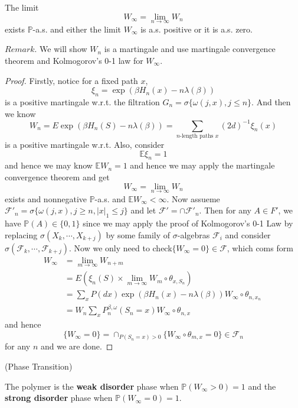 \begin{theorem}
    The limit
    \[W_{\infty} = \lim\limits_{n\to\infty} W_n\]
    exists $\mathbb{P}$-a.s. and either the limit $W_{\infty}$ is a.s. positive or it is a.s. zero.
\end{theorem}
$Remark$. We will show $W_n$ is a martingale and use martingale convergence theorem and Kolmogorov's 0-1 law for $W_{\infty}$.
\begin{proof}
    Firstly, notice for a fixed path $x$,
    \[
    \xi_n = \exp{(\beta H_n(x)- n\lambda(\beta))}
    \]
    is a positive martingale w.r.t. the filtration $G_n = \sigma\{\omega(j,x), j\leq n\}$. And then we know
    \[
    W_n = E \exp(\beta H_n(S) - n\lambda(\beta)) = \sum\limits_{n\text{-length paths }x}(2d)^{-1} \xi_n(x)
    \]
    is a positive martingale w.r.t. Also, consider
    \[
    \mathbb{E}\xi_n = 1 
    \]
    and hence we may know $\mathbb{E}W_n = 1$ and hence we may apply the martingale convergence theorem and get
    \[
    W_{\infty} = \lim_{n\to\infty} W_n
    \]
    exists and nonnegative $\mathbb{P}$-a.s. and $\mathbb{E}W_{\infty} < \infty$. Now assueme $\mathcal{F}'_n = \sigma\{\omega(j,x), j \geq n, |x|_1 \leq j\}$ and let $\mathcal{F}' = \cap \mathcal{F}'_n$. Then for any $A \in F'$, we have $\mathbb{P}(A)\in\{0,1\}$ since we may apply the proof of Kolmogorov's 0-1 Law by replacing $\sigma(X_k,\cdots,X_{k+j})$ by some family of $\sigma$-algebras $\mathcal{F}_i$ and consider $\sigma(\mathcal{F}_k,\cdots,\mathcal{F}_{k+j})$. Now we only need to check$\{W_{\infty} = 0\} \in \mathcal{F}$, which coms form 
    \[
    \begin{aligned}
        W_{\infty} &= \lim_{m\to\infty} W_{n+m} \\
        &= E(\xi_n(S)\times \lim_{m\to\infty}W_m \circ \theta_{x,S_n}) \\
        &= \sum\limits_{x} P(dx)\exp({\beta H_n(x) -n\lambda(\beta)})W_{\infty}\circ \theta_{n,x_n}\ \\
        &= W_n \sum_{x} P_n^{\beta,\omega}(S_n = x) W_{\infty} \circ \theta_{n,x}
    \end{aligned}
    \]
    and hence
    \[
    \{W_{\infty} = 0\} = \cap_{P(S_n = x) > 0} \{W_{\infty}\circ\theta_{m,x} = 0\} \in \mathcal{F}_n 
    \]
    for any $n$ and we are done.
\end{proof}

\begin{definition}
    (Phase Transition)\par
    The polymer is the \textbf{weak disorder} phase when $\mathbb{P}(W_{\infty} > 0) = 1$ and the \textbf{strong disorder} phase when $\mathbb{P}(W_{\infty} = 0) = 1$.
\end{definition}

